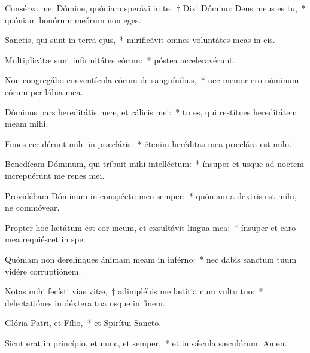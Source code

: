 \item Consérva me, Dómine, quóniam sperávi in te:~† Dixi Dómino: Deus meus es tu,~* quóniam bonórum meórum non eges.

\item Sanctis, qui sunt in terra ejus,~* mirificávit omnes voluntátes meas in eis.

\item Multiplicátæ sunt infirmitátes eórum:~* póstea acceleravérunt.

\item Non congregábo conventícula eórum de sanguínibus,~* nec memor ero nóminum eórum per lábia mea.

\item Dóminus pars hereditátis meæ, et cálicis mei:~* tu es, qui restítues hereditátem meam mihi.

\item Funes cecidérunt mihi in præcláris:~* étenim heréditas mea præclára est mihi.

\item Benedícam Dóminum, qui tríbuit mihi intelléctum:~* ínsuper et usque ad noctem increpuérunt me renes mei.

\item Providébam Dóminum in conspéctu meo semper:~* quóniam a dextris est mihi, ne commóvear.

\item Propter hoc lætátum est cor meum, et exsultávit lingua mea:~* ínsuper et caro mea requiéscet in spe.

\item Quóniam non derelínques ánimam meam in inférno:~* nec dabis sanctum tuum vidére corruptiónem.

\item Notas mihi fecísti vias vitæ,~† adimplébis me lætítia cum vultu tuo:~* delectatiónes in déxtera tua usque in finem.

\item Glória Patri, et Fílio,~* et Spirítui Sancto.

\item Sicut erat in princípio, et nunc, et semper,~* et in sǽcula sæculórum. Amen.

